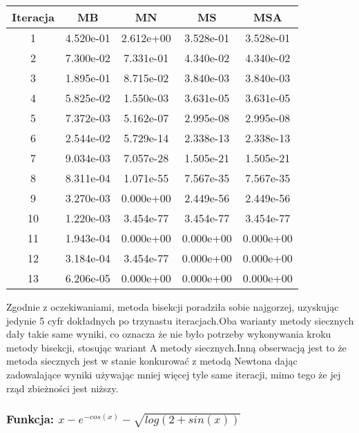 \documentclass[11pt,wide]{article}
\begin{document}
\begin{center}
    \begin{tabular}{| c | c | c | c | c |}
    \hline
    Iteracja & MB & MN & MS & MSA \\ \hline \hline
	1 & 4.520e-01 & 2.612e+00 & 3.528e-01 & 3.528e-01 \\ \hline
	2 & 7.300e-02 & 7.331e-01 & 4.340e-02 & 4.340e-02 \\ \hline
	3 & 1.895e-01 & 8.715e-02 & 3.840e-03 & 3.840e-03 \\ \hline
	4 & 5.825e-02 & 1.550e-03 & 3.631e-05 & 3.631e-05 \\ \hline
	5 & 7.372e-03 & 5.162e-07 & 2.995e-08 & 2.995e-08 \\ \hline
	6 & 2.544e-02 & 5.729e-14 & 2.338e-13 & 2.338e-13 \\ \hline
	7 & 9.034e-03 & 7.057e-28 & 1.505e-21 & 1.505e-21 \\ \hline
	8 & 8.311e-04 & 1.071e-55 & 7.567e-35 & 7.567e-35 \\ \hline
	9 & 3.270e-03 & 0.000e+00 & 2.449e-56 & 2.449e-56 \\ \hline
	10 & 1.220e-03 & 3.454e-77 & 3.454e-77 & 3.454e-77 \\ \hline
	11 & 1.943e-04 & 0.000e+00 & 0.000e+00 & 0.000e+00 \\ \hline
	12 & 3.184e-04 & 3.454e-77 & 0.000e+00 & 0.000e+00 \\ \hline
	13 & 6.206e-05 & 0.000e+00 & 0.000e+00 & 0.000e+00 \\ \hline
    \end{tabular}
\end{center}
\noindent
Zgodnie z oczekiwaniami, metoda bisekcji poradziła sobie najgorzej, uzyskując jedynie 5 cyfr dokładnych po trzynastu iteracjach.Oba warianty metody siecznych dały takie same wyniki, co oznacza że nie było potrzeby wykonywania kroku metody bisekcji, stosując wariant A metody siecznych.Inną obserwacją jest to że metoda siecznych jest w stanie konkurować z metodą Newtona dając zadowalające wyniki używając mniej więcej tyle same iteracji, mimo tego że jej rząd zbieżności jest niższy.

\subsubsection{Funkcja: $x - e^{-cos(x)} - \sqrt{log(2 + sin(x))}$}

\begin{center}
\end{center}
\noindent
\end{document}
